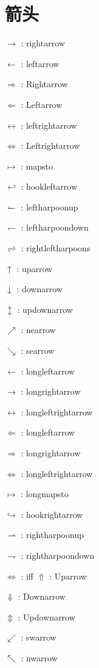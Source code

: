 \documentclass[UTF8]{ctexart}
\begin{document}
\section{箭头}
\begin{multicols}{2}
$\rightarrow$ : rightarrow \par
$\leftarrow$ : leftarrow \par
$\Rightarrow$ : Rightarrow \par
$\Leftarrow$ : Leftarrow \par
$\leftrightarrow$ : leftrightarrow \par
$\Leftrightarrow$ : Leftrightarrow \par
$\mapsto$ : mapsto \par
$\hookleftarrow$ : hookleftarrow \par
$\leftharpoonup$ : leftharpoonup \par
$\leftharpoondown$ : leftharpoondown \par
$\rightleftharpoons$ : rightleftharpoons \par
$\uparrow$ : uparrow \par
$\downarrow$ : downarrow \par
$\updownarrow$ : updownarrow \par
$\nearrow$ : nearrow \par
$\searrow$ : searrow \par

$\longleftarrow$ : longleftarrow \par
$\longrightarrow$ : longrightarrow \par
$\longleftrightarrow$ : longleftrightarrow \par
$\Longleftarrow$ : longleftarrow \par
$\Longrightarrow$ : longrightarrow \par
$\Longleftrightarrow$ : longleftrightarrow \par
$\longmapsto$ : longmapsto\par
$\hookrightarrow$ : hookrightarrow \par
$\rightharpoonup$ : rightharpoonup \par
$\rightharpoondown$ : rightharpoondown \par
$\iff$ : iff
$\Uparrow$ : Uparrow \par
$\Downarrow$ : Downarrow \par
$\Updownarrow$ : Updownarrow \par
$\swarrow$ : swarrow \par
$\nwarrow$ : nwarrow \par

\end{multicols}
\end{document}
